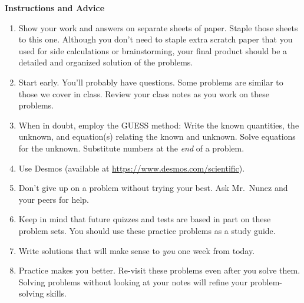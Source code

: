 \documentclass[addpoints]{exam}
\begin{document}
\begin{questions}
\clearpage

\textbf{Instructions and Advice}
\begin{enumerate}
\setlength\itemsep{0.1ex}
    \item Show your work and answers on separate sheets of paper. Staple those sheets to this one. Although you don't need to staple extra scratch paper that you used for side calculations or brainstorming, your final product should be a detailed and organized solution of the problems.
    \item Start early. You'll probably have questions. Some problems are similar to those we cover in class. Review your class notes as you work on these problems.
    \item When in doubt, employ the GUESS method: Write the known quantities, the unknown, and equation(s) relating the known and unknown. Solve equations for the unknown. Substitute numbers at the \textit{end} of a problem.
    \item Use Desmos (available at \href{https://www.desmos.com/scientific}{https://www.desmos.com/scientific}).
    \item Don't give up on a problem without trying your best. Ask Mr.~Nunez and your peers for help.
    \item Keep in mind that future quizzes and tests are based in part on these problem sets. You should use these practice problems as a study guide.
    \item Write solutions that will make sense to \textit{you} one week from today.
    \item Practice makes you better. Re-visit these problems even after you solve them. Solving problems without looking at your notes will refine your problem-solving skills.
\end{enumerate}


\end{questions}
\end{document}
